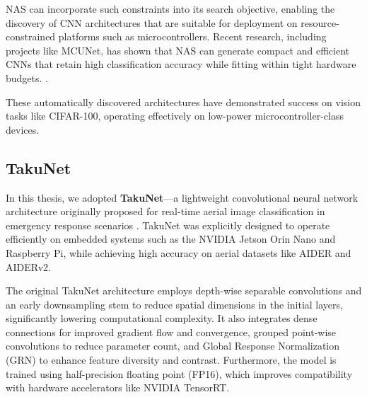 NAS can incorporate such constraints into its search objective, enabling the discovery of CNN architectures that are suitable for deployment on resource-constrained platforms such as microcontrollers. Recent research, including projects like MCUNet, has shown that NAS can generate compact and efficient CNNs that retain high classification accuracy while fitting within tight hardware budgets. \cite{pau2023quantitative}.

These automatically discovered architectures have demonstrated success on vision tasks like CIFAR-100, operating effectively on low-power microcontroller-class devices.

\subsection{TakuNet}

\begin{comment}
 In this thesis, we adopted \textbf{TakuNet}—a lightweight convolutional neural network architecture originally proposed for real-time aerial image classification in emergency response scenarios~\cite{TakuNet}. TakuNet was explicitly designed to operate efficiently on embedded systems such as the NVIDIA Jetson Orin Nano and Raspberry Pi, while achieving high accuracy on aerial datasets like AIDER and AIDERv2. In our context, TakuNet serves as a reference architecture and proof of concept for applying the NAS algorithm to a specific dataset. It provides a concrete and well-established starting point to explore the effects of architecture search under embedded system constraints.   
\end{comment}



In this thesis, we adopted \textbf{TakuNet}—a lightweight convolutional neural network architecture originally proposed for real-time aerial image classification in emergency response scenarios \cite{TakuNet}. TakuNet was explicitly designed to operate efficiently on embedded systems such as the NVIDIA Jetson Orin Nano and Raspberry Pi, while achieving high accuracy on aerial datasets like AIDER and AIDERv2.

The original TakuNet architecture employs depth-wise separable convolutions and an early downsampling stem to reduce spatial dimensions in the initial layers, significantly lowering computational complexity. It also integrates dense connections for improved gradient flow and convergence, grouped point-wise convolutions to reduce parameter count, and Global Response Normalization (GRN) to enhance feature diversity and contrast. Furthermore, the model is trained using half-precision floating point (FP16), which improves compatibility with hardware accelerators like NVIDIA TensorRT.

